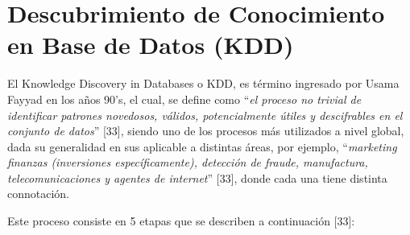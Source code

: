 \section{Descubrimiento de Conocimiento en Base de Datos (KDD)}

El Knowledge Discovery in Databases o KDD, es término ingresado por Usama Fayyad en los años 90’s, el cual, se define como “\textit{el proceso no trivial de identiﬁcar patrones novedosos, válidos, potencialmente útiles y descifrables en el conjunto de datos}” [33], siendo uno de los procesos más utilizados a nivel global, dada su generalidad en sus aplicable a distintas áreas, por ejemplo, “\textit{marketing finanzas (inversiones especíﬁcamente), detección de fraude, manufactura, telecomunicaciones y agentes de internet}” [33], donde cada una tiene distinta connotación.

Este proceso consiste en 5 etapas que se describen a continuación [33]:

